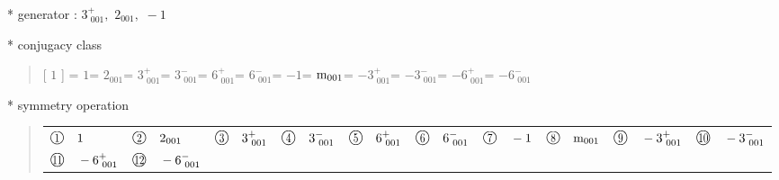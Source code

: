 \documentclass[fleqn,10pt,landscape]{jsarticle}
\begin{document}
* generator : $3^{+}_{\,\,001},\,\,2{}_{001},\,\,-1$

* conjugacy class
\begin{quote}
[ $1$ ] = \quad $1$\newline[ $2{}_{001}$ ] = \quad $2{}_{001}$\newline[ $3^{+}_{\,\,001}$ ] = \quad $3^{+}_{\,\,001}$\newline[ $3^{-}_{\,\,001}$ ] = \quad $3^{-}_{\,\,001}$\newline[ $6^{+}_{\,\,001}$ ] = \quad $6^{+}_{\,\,001}$\newline[ $6^{-}_{\,\,001}$ ] = \quad $6^{-}_{\,\,001}$\newline[ $-1$ ] = \quad $-1$\newline[ ${\rm m}_{001}$ ] = \quad ${\rm m}_{001}$\newline[ $-3^{+}_{\,\,001}$ ] = \quad $-3^{+}_{\,\,001}$\newline[ $-3^{-}_{\,\,001}$ ] = \quad $-3^{-}_{\,\,001}$\newline[ $-6^{+}_{\,\,001}$ ] = \quad $-6^{+}_{\,\,001}$\newline[ $-6^{-}_{\,\,001}$ ] = \quad $-6^{-}_{\,\,001}$\newline
\end{quote}

* symmetry operation
\begin{quote}
\begin{tabular}{llllllllll}
$ {\ooalign{\hfil\resizebox{.8\width}{\height}{1}\hfil\crcr\raise.1ex\hbox{\large$\bigcirc$}}}\quad 1 $ & $ {\ooalign{\hfil\resizebox{.8\width}{\height}{2}\hfil\crcr\raise.1ex\hbox{\large$\bigcirc$}}}\quad 2{}_{001} $ & $ {\ooalign{\hfil\resizebox{.8\width}{\height}{3}\hfil\crcr\raise.1ex\hbox{\large$\bigcirc$}}}\quad 3^{+}_{\,\,001} $ & $ {\ooalign{\hfil\resizebox{.8\width}{\height}{4}\hfil\crcr\raise.1ex\hbox{\large$\bigcirc$}}}\quad 3^{-}_{\,\,001} $ & $ {\ooalign{\hfil\resizebox{.8\width}{\height}{5}\hfil\crcr\raise.1ex\hbox{\large$\bigcirc$}}}\quad 6^{+}_{\,\,001} $ & $ {\ooalign{\hfil\resizebox{.8\width}{\height}{6}\hfil\crcr\raise.1ex\hbox{\large$\bigcirc$}}}\quad 6^{-}_{\,\,001} $ & $ {\ooalign{\hfil\resizebox{.8\width}{\height}{7}\hfil\crcr\raise.1ex\hbox{\large$\bigcirc$}}}\quad -1 $ & $ {\ooalign{\hfil\resizebox{.8\width}{\height}{8}\hfil\crcr\raise.1ex\hbox{\large$\bigcirc$}}}\quad {\rm m}_{001} $ & $ {\ooalign{\hfil\resizebox{.8\width}{\height}{9}\hfil\crcr\raise.1ex\hbox{\large$\bigcirc$}}}\quad -3^{+}_{\,\,001} $ & $ {\ooalign{\hfil\resizebox{.8\width}{\height}{10}\hfil\crcr\raise.1ex\hbox{\large$\bigcirc$}}}\quad -3^{-}_{\,\,001} $ \\
$ {\ooalign{\hfil\resizebox{.8\width}{\height}{11}\hfil\crcr\raise.1ex\hbox{\large$\bigcirc$}}}\quad -6^{+}_{\,\,001} $ & $ {\ooalign{\hfil\resizebox{.8\width}{\height}{12}\hfil\crcr\raise.1ex\hbox{\large$\bigcirc$}}}\quad -6^{-}_{\,\,001} $ & $  $ & $  $ & $  $ & $  $ & $  $ & $  $ & $  $ & $  $
\end{tabular}
\end{quote}
\end{document}
